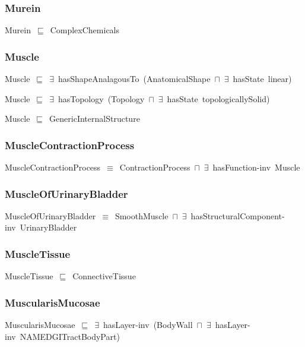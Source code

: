 \documentclass{article}
\begin{document}
\subsubsection*{Murein}

Murein~\ensuremath{\sqsubseteq}~ComplexChemicals~

\subsubsection*{Muscle}

Muscle~\ensuremath{\sqsubseteq}~\ensuremath{\exists}~hasShapeAnalagousTo~(AnatomicalShape~\ensuremath{\sqcap}~\ensuremath{\exists}~hasState~linear)~

Muscle~\ensuremath{\sqsubseteq}~\ensuremath{\exists}~hasTopology~(Topology~\ensuremath{\sqcap}~\ensuremath{\exists}~hasState~topologicallySolid)~

Muscle~\ensuremath{\sqsubseteq}~GenericInternalStructure~

\subsubsection*{MuscleContractionProcess}

MuscleContractionProcess~\ensuremath{\equiv}~ContractionProcess~\ensuremath{\sqcap}~\ensuremath{\exists}~hasFunction-inv~Muscle

\subsubsection*{MuscleOfUrinaryBladder}

MuscleOfUrinaryBladder~\ensuremath{\equiv}~SmoothMuscle~\ensuremath{\sqcap}~\ensuremath{\exists}~hasStructuralComponent-inv~UrinaryBladder

\subsubsection*{MuscleTissue}

MuscleTissue~\ensuremath{\sqsubseteq}~ConnectiveTissue~

\subsubsection*{MuscularisMucosae}

MuscularisMucosae~\ensuremath{\sqsubseteq}~\ensuremath{\exists}~hasLayer-inv~(BodyWall~\ensuremath{\sqcap}~\ensuremath{\exists}~hasLayer-inv~NAMEDGITractBodyPart)~
\end{document}
